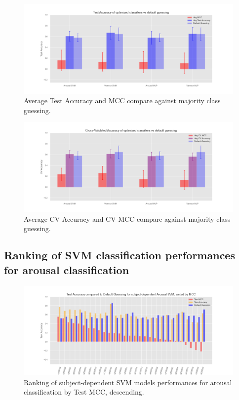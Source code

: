 \begin{figure}[!htb]
\includegraphics[width=16cm]{img/appendix/final_experiment/experiment_test_recap.png}
\centering
\caption{Average Test Accuracy and MCC compare against majority class guessing.}\label{fig:experiment_test_recap}
\end{figure}

\begin{figure}[!htb]
\includegraphics[width=16cm]{img/appendix/final_experiment/experiment_cv_recap.png}
\centering
\caption{Average CV Accuracy and CV MCC compare against majority class guessing.}\label{fig:experiment_cv_recap}
\end{figure}

\subsection{Ranking of SVM classification performances for arousal classification}
\label{sec:appendix_A4.1}

\begin{figure}[!htb]
\includegraphics[width=16cm]{img/appendix/final_experiment/test_acc_mcc_arousal_svm.png}
\centering
\caption{Ranking of subject-dependent SVM models performances for arousal classification by Test MCC, descending.}\label{fig:test_acc_mcc_arousal_svm}
\end{figure}

